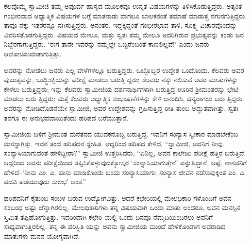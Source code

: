 ಕೆಲವೊಮ್ಮೆ ಸ್ವಾಮೀಜಿ ತಮ್ಮ ಅಪೂರ್ವ ಹಾಸ್ಯದ ಮೂಲಕವೂ ಉನ್ನತ ವಿಷಯಗಳನ್ನು ತಿಳಿಸಿಕೊಡುತ್ತಿದ್ದರು. ಅತ್ಯಂತ ಗಂಭೀರವಾದ ಆಧ್ಯಾತ್ಮಿಕ ವಿಷಯಗಳ ಬಗ್ಗೆ ಮಾತನಾಡು ವಾಗಲೂ ಬಾಲಕನಂತೆ ತಮಾಷೆ ಮಾಡುತ್ತ ನಗುನಗುತ್ತಿದ್ದರು. ತಾವೂ ನಕ್ಕು ಇತರರನ್ನೂ ನಗಿಸುತ್ತಿದ್ದರು. ಅನಂತರ, ಇದ್ದಕ್ಕಿದ್ದಂತೆ ಗಂಭೀರಭಾವ ತಾಳಿ, ಸೂಕ್ಷ್ಮ ವಿಚಾರವೊಂದನ್ನು ವಿವರಿಸತೊಡಗುತ್ತಿದ್ದರು. ವಿಷಯದ ಮೇಲೂ, ಮತ್ತು ಸ್ವತಃ ತಮ್ಮ ಮೇಲೂ ಅವರಿಗಿರುವ ಪ್ರಭುತ್ವವನ್ನು ಕಂಡು ಜನ ನಿಬ್ಬೆರಗಾಗುತ್ತಿದ್ದರು. ‘ಈಗ ತಾನೇ ಇವರನ್ನು ನಮ್ಮಲ್ಲೇ ಒಬ್ಬರೆಂಬಂತೆ ಕಾಣಲಿಲ್ಲವೆ!’ ಎಂದು ಜನರು ಆಲೋಚಿಸುವಂತಾಗುತ್ತಿತ್ತು.

ಅವರನ್ನು ನೋಡಲು ಜನರು ಎಲ್ಲ ವೇಳೆಗಳಲ್ಲೂ ಬರುತ್ತಿದ್ದರು. ಒಬ್ಬೊಬ್ಬರ ಉದ್ದೇಶ ಒಂದೊಂದು. ಕೆಲವರು ಅವರ ಪುಜುತ್ವವನ್ನು, ಬುದ್ಧಿಶಕ್ತಿಯನ್ನು ಪರೀಕ್ಷೆ ಮಾಡಲು ಬರುತ್ತಿ ದ್ದರು; ಕೆಲವರು ನಕ್ಕು ನಲಿಸುವ ಅವರ ಮಾತುಗಳನ್ನು ಕೇಳಲು ಬರುತ್ತಿದ್ದರು; ಇನ್ನು ಕೆಲವರು ಸ್ವಾಮೀಜಿಯ ದರ್ಶನಾರ್ಥಿಗಳಾಗಿ ಬರುತ್ತಿದ್ದ ಊರಿನ ಶ್ರೀಮಂತರನ್ನು ಭೇಟಿ ಮಾಡಲು ಬರು ತ್ತಿದ್ದರು; ಮತ್ತೆ ಕೆಲವರು ಆಧ್ಯಾತ್ಮಿಕ ಸಂಭಾಷಣೆಗಳನ್ನು ಕೇಳಿ ಆನಂದಿಸಿ, ಧನ್ಯರಾಗಲು ಬರು ತ್ತಿದ್ದರು. ಅವರನ್ನು ನೋಡಿದೊಡನೆಯೇ ಸ್ವಾಮೀಜಿ, ಅವರ ಉದ್ದೇಶವನ್ನು ಗ್ರಹಿಸುತ್ತಿದ್ದ ರೀತಿ ತುಂಬ ಅದ್ಭುತವಾಗಿತ್ತು. ಸ್ವತಃ ತನಗೂ ಈ ಅನುಭವವಾಯಿತೆಂದು ಹರಿಪದ ಬರೆಯುತ್ತಾನೆ.

ಸ್ವಾಮೀಜಿಯ ಬಳಿಗೆ ಶ್ರೀಮಂತ ಮನೆತನದ ಯುವಕನೊಬ್ಬ ಬರುತ್ತಿದ್ದ. ಇವನಿಗೆ ಸಂನ್ಯಾಸ ಸ್ವೀಕಾರ ಮಾಡಬೇಕೆಂಬ ಮನಸ್ಸಾಗಿತ್ತು. ಇವನ ತಂದೆ ಹರಿಪದನ ಸ್ನೇಹಿತ. ಆದ್ದರಿಂದ ಹರಿಪದ ಕೇಳಿದ, “ಸ್ವಾಮೀಜಿ, ಅವನಿಗೆ ನೀವು ಸಂನ್ಯಾಸಿಯಾಗುವಂತೆ ಹೇಳಿದ್ದೀರಾ?” ಸ್ವಾಮೀಜಿ ಉತ್ತರಿಸಿದರು, “ಏನಿಲ್ಲ, ಅವನ ಕಾಲೇಜು ಪರೀಕ್ಷೆ ಹತ್ತಿರ ಬರುತ್ತಿದೆ. ಆದ್ದರಿಂದ ಅವನು ಪರೀಕ್ಷೆಯಿಂದ ತಪ್ಪಿಸಿಕೊಳ್ಳುವುದಕ್ಕೋಸ್ಕರ ‘ಸಂನ್ಯಾಸಿಯಾಗುತ್ತೇನೆ’ ಎನ್ನುತ್ತಿದ್ದಾನೆ, ಅಷ್ಟೆ. ನಾನವನಿಗೆ ಹೇಳಿದೆ–‘ನೀನು ಎಂ. ಎ. ಪಾಸು ಮಾಡಿಕೊಂಡು ಬಂದು ಸಂನ್ಯಾಸಿಯಾಗು; ಸಂನ್ಯಾಸ ಜೀವನ ನಡೆಸುವುಕ್ಕಿಂತ ಎಂ. ಎ. ಪದವಿ ಪಡೆಯುವುದು ಸುಲಭ’ ಅಂತ.”

ಹರಿಪದನಿಗೆ ಕೈತುಂಬ ಸಂಬಳ ಬರುವ ಉದ್ಯೋಗವಿತ್ತು. ಆದರೆ ಕಛೇರಿಯಲ್ಲಿ ಮೇಲಧಿಕಾರಿ ಗಳೊಂದಿಗೆ ಅವನ ಸಂಬಂಧ ಅಷ್ಟು ಚೆನ್ನಾಗಿರಲಿಲ್ಲ. ಮೇಲಧಿಕಾರಿಗಳು ತನ್ನ ವಿಷಯವಾಗಿ ಒಂದು ಮಾತು ಅಂದರೂ, ಅವನ ಮನಸ್ಸಿನ ಸ್ತಿಮಿತ ತಪ್ಪಿಹೋಗುತ್ತಿತ್ತು. ಇದರಿಂದಾಗಿ ಕಛೇರಿ ಯಲ್ಲಿ ಒಂದು ದಿನವೂ ನೆಮ್ಮದಿಯಿಂದಿರಲು ಅವನಿಗೆ ಸಾಧ್ಯವಾಗುತ್ತಿರಲಿಲ್ಲ. ತನ್ನ ಈ ಪರಿಸ್ಥಿತಿ ಯನ್ನು ಅವನು ಸ್ವಾಮೀಜಿಯ ಮುಂದೆ ಹೇಳಿಕೊಂಡಾಗ ಅವರಾಡಿದ ಮಾತುಗಳು ಮನನ ಯೋಗ್ಯವಾಗಿವೆ:

